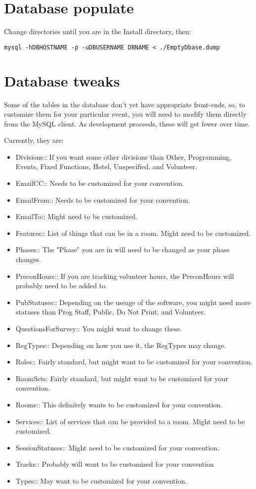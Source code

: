 \documentclass[captions=tablesignature]{scrartcl}
\begin{document}
\section{Database populate}
\label{sec-5}

Change directories until you are in the Install directory, then:
\begin{verbatim}
mysql -hDBHOSTNAME -p -uDBUSERNAME DBNAME < ./EmptyDbase.dump
\end{verbatim}

\section{Database tweaks}
\label{sec-6}

Some of the tables in the database don't yet have appropriate
front-ends, so, to customize them for your particular event, you
will need to modify them directly from the MySQL client.  As
development proceeds, these will get fewer over time.

Currently, they are:
\begin{itemize}
\item Divisions:: If you want some other divisions than Other,
Programming, Events, Fixed Functions, Hotel, Unspecified, and
Volunteer.
\item EmailCC:: Needs to be customized for your convention.
\item EmailFrom:: Needs to be customized for your convention.
\item EmailTo:: Might need to be customized.
\item Features:: List of things that can be in a room.  Might need to be
customized.
\item Phases:: The "Phase" you are in will need to be changed as your
phase changes.
\item PreconHours:: If you are tracking volunteer hours, the PreconHours
will probably need to be added to.
\item PubStatuses:: Depending on the useage of the software, you might
need more statuses than Prog Staff, Public, Do Not Print, and
Volunteer.
\item QuestionsForSurvey:: You might want to change these.
\item RegTypes:: Depending on how you use it, the RegTypes may change.
\item Roles:: Fairly standard, but might want to be customized for your
convention.
\item RoomSets: Fairly standard, but might want to be customized for
your convention.
\item Rooms:: This definitely wants to be customized for your
convention.
\item Services:: List of services that can be provided to a room.  Might
need to be customized.
\item SessionStatuses:: Might need to be customized for your
convention.
\item Tracks:: Probably will want to be customized for your convention
\item Types:: May want to be customized for your convention.
\end{itemize}
\end{document}
